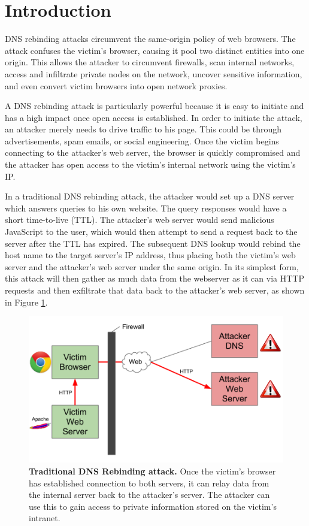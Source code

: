 \section{Introduction}
\label{sec:intro}


DNS rebinding attacks circumvent the same-origin policy of web browsers. The attack confuses the victim's browser, causing it pool two distinct entities into one origin. This allows the attacker to circumvent firewalls, scan internal networks, access and infiltrate private nodes on the network, uncover sensitive information, and even convert victim browsers into open network proxies.

A DNS rebinding attack is particularly powerful because it is easy to initiate and has a high impact once open access is established. In order to initiate the attack, an attacker merely needs to drive traffic to his page. This could be through advertisements, spam emails, or social engineering. Once the victim begins connecting to the attacker's web server, the browser is quickly compromised and the attacker has open access to the victim's internal network using the victim's IP.

In a traditional DNS rebinding attack, the attacker would set up a DNS server which answers queries to his own website. The query responses would have a short time-to-live (TTL). The attacker's web server would send malicious JavaScript to the user, which would then attempt to send a request back to the server after the TTL has expired. The subsequent DNS lookup would rebind the host name to the target server's IP address, thus placing both the victim's web server and the attacker's web server under the same origin. In its simplest form, this attack will then gather as much data from the webserver as it can via HTTP requests and then exfiltrate that data back to the attacker's web server, as shown in Figure \ref{fig:dnsrebind1}.

\begin{figure}[h]
\centering
\includegraphics[width=0.8\columnwidth]{dnsrebind1.png}
\caption{\textbf{Traditional DNS Rebinding attack.} Once the victim's browser has established connection to both servers, it can relay data from the internal server back to the attacker's server.  The attacker can use this to gain access to private information stored on the victim's intranet.}
\label{fig:dnsrebind1}
\end{figure}


